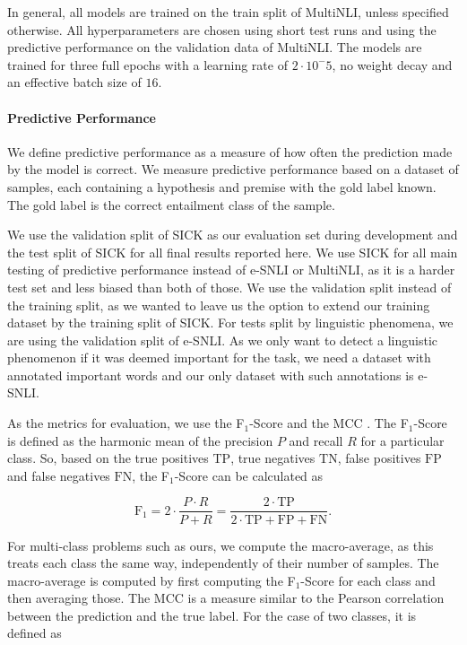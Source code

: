 In general, all models are trained on the train split of \acs{MultiNLI}, unless specified otherwise. All hyperparameters are chosen using short test runs and using the predictive performance on the validation data of \acs{MultiNLI}. The models are trained for three full epochs with a learning rate of $2 \cdot 10^-5$, no weight decay and an effective batch size of $16$.

\paragraph{Predictive Performance}
We define predictive performance as a measure of how often the prediction made by the model is correct. We measure predictive performance based on a dataset of samples, each containing a hypothesis and premise with the gold label known. The gold label is the correct entailment class of the sample.

We use the validation split of \ac{SICK} as our evaluation set during development and the test split of \ac{SICK} for all final results reported here. We use \ac{SICK} for all main testing of predictive performance instead of \ac{e-SNLI} or \ac{MultiNLI}, as it is a harder test set and less biased than both of those. We use the validation split instead of the training split, as we wanted to leave us the option to extend our training dataset by the training split of \ac{SICK}. For tests split by linguistic phenomena, we are using the validation split of \ac{e-SNLI}. As we only want to detect a linguistic phenomenon if it was deemed important for the task, we need a dataset with annotated important words and our only dataset with such annotations is \ac{e-SNLI}.

As the metrics for evaluation, we use the F$_1$-Score and the \ac{MCC} \cite{mcc}. The F$_1$-Score is defined as the harmonic mean of the precision $P$ and recall $R$ for a particular class. So, based on the true positives $\mathrm{TP}$, true negatives $\mathrm{TN}$, false positives $\mathrm{FP}$ and false negatives $\mathrm{FN}$, the F$_1$-Score can be calculated as 

$$\text{F}_1 = 2\cdot \frac{P \cdot R}{P + R} = \frac{2 \cdot \mathrm{TP}}{2\cdot \mathrm{TP} + \mathrm{FP} + \mathrm{FN}}.$$

For multi-class problems such as ours, we compute the macro-average, as this treats each class the same way, independently of their number of samples. The macro-average is computed by first computing the F$_1$-Score for each class and then averaging those. The \ac{MCC} is a measure similar to the Pearson correlation between the prediction and the true label. For the case of two classes, it is defined as 


